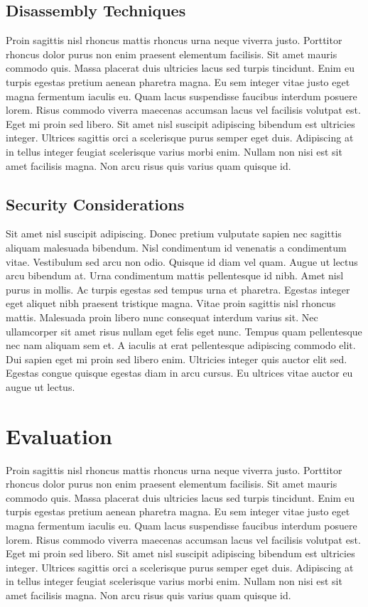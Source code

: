 \documentclass[a4paper,12pt]{article}
\begin{document}
\begin{multicols}{2}
\subsection{Disassembly Techniques}
Proin sagittis nisl rhoncus mattis rhoncus urna neque viverra justo. Porttitor rhoncus dolor purus non enim praesent elementum facilisis. Sit amet mauris commodo quis. Massa placerat duis ultricies lacus sed turpis tincidunt. Enim eu turpis egestas pretium aenean pharetra magna. Eu sem integer vitae justo eget magna fermentum iaculis eu. Quam lacus suspendisse faucibus interdum posuere lorem. Risus commodo viverra maecenas accumsan lacus vel facilisis volutpat est. Eget mi proin sed libero. Sit amet nisl suscipit adipiscing bibendum est ultricies integer. Ultrices sagittis orci a scelerisque purus semper eget duis. Adipiscing at in tellus integer feugiat scelerisque varius morbi enim. Nullam non nisi est sit amet facilisis magna. Non arcu risus quis varius quam quisque id.

\subsection{Security Considerations}
Sit amet nisl suscipit adipiscing. Donec pretium vulputate sapien nec sagittis aliquam malesuada bibendum. Nisl condimentum id venenatis a condimentum vitae. Vestibulum sed arcu non odio. Quisque id diam vel quam. Augue ut lectus arcu bibendum at. Urna condimentum mattis pellentesque id nibh. Amet nisl purus in mollis. Ac turpis egestas sed tempus urna et pharetra. Egestas integer eget aliquet nibh praesent tristique magna. Vitae proin sagittis nisl rhoncus mattis. Malesuada proin libero nunc consequat interdum varius sit. Nec ullamcorper sit amet risus nullam eget felis eget nunc. Tempus quam pellentesque nec nam aliquam sem et. A iaculis at erat pellentesque adipiscing commodo elit. Dui sapien eget mi proin sed libero enim. Ultricies integer quis auctor elit sed. Egestas congue quisque egestas diam in arcu cursus. Eu ultrices vitae auctor eu augue ut lectus.

\section{Evaluation}
Proin sagittis nisl rhoncus mattis rhoncus urna neque viverra justo. Porttitor rhoncus dolor purus non enim praesent elementum facilisis. Sit amet mauris commodo quis. Massa placerat duis ultricies lacus sed turpis tincidunt. Enim eu turpis egestas pretium aenean pharetra magna. Eu sem integer vitae justo eget magna fermentum iaculis eu. Quam lacus suspendisse faucibus interdum posuere lorem. Risus commodo viverra maecenas accumsan lacus vel facilisis volutpat est. Eget mi proin sed libero. Sit amet nisl suscipit adipiscing bibendum est ultricies integer. Ultrices sagittis orci a scelerisque purus semper eget duis. Adipiscing at in tellus integer feugiat scelerisque varius morbi enim. Nullam non nisi est sit amet facilisis magna. Non arcu risus quis varius quam quisque id.


\end{multicols}
\end{document}
